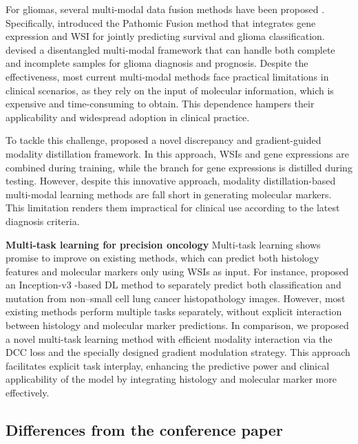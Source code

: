 For gliomas, several multi-modal data fusion methods have  been proposed \citep{chen2020pathomic, qiu2024dual}. Specifically, \cite{chen2020pathomic} introduced the Pathomic Fusion method that integrates gene expression  and WSI for jointly predicting survival and glioma classification. \cite{qiu2024dual} devised a disentangled multi-modal framework that can handle both complete and incomplete samples for glioma diagnosis and prognosis.  Despite the effectiveness, most current multi-modal methods face practical limitations in clinical scenarios, as they  rely on the input of molecular information, which is expensive and time-consuming to obtain. This dependence hampers their applicability and widespread adoption in clinical practice.


To tackle this challenge, \cite{xing2022discrepancy} proposed a novel discrepancy and gradient-guided modality distillation framework. In this approach, WSIs and gene expressions are combined during training, while the branch for gene expressions is distilled during testing. However, despite this innovative approach, modality distillation-based multi-modal learning methods are fall short in  generating molecular markers. This limitation renders them impractical for clinical use according to the latest diagnosis criteria. 



\noindent\textbf{Multi-task learning for precision oncology}
Multi-task learning shows promise to improve on existing methods, which can predict both histology features and molecular markers only using WSIs as input. For instance, \cite{coudray2018classification} proposed an Inception-v3 \citep{szegedy2016rethinking}-based DL method to separately predict both classification and mutation from non–small cell lung cancer histopathology images. However, most existing methods perform multiple tasks separately, without explicit interaction between histology and molecular marker predictions. In comparison, we proposed a novel multi-task learning method with efficient modality interaction via the DCC loss and the specially designed gradient modulation strategy. This approach facilitates explicit task interplay, enhancing the predictive power and clinical applicability of the model by integrating histology and molecular marker more effectively.


\vspace{-.5em}
\subsection{Differences from the conference paper}

